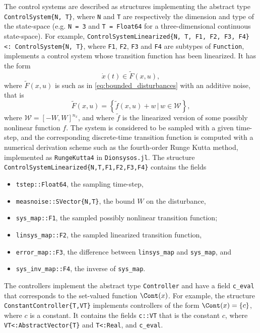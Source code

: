 \documentclass{juliacon}
\begin{document}
The control systems are described as structures implementing the abstract type \texttt{ControlSystem\{N, T\}}, where \texttt{N} and \texttt{T} are respectively the dimension and type of the state-space (e.g. \texttt{N = 3} and \texttt{T = Float64} for a three-dimensional continuous state-space). For example, \texttt{ControlSystemLinearized\{N, T, F1, F2, F3, F4\} <: ControlSystem\{N, T\}}, where \texttt{F1}, \texttt{F2}, \texttt{F3} and \texttt{F4} are subtypes of \texttt{Function}, implements a control system whose transition function has been linearized. It has the form
\begin{equation}
    \dot{x}(t) \in \tilde{F}(x, u), 
\end{equation}
where $\tilde{F}(x, u)$ is such as in \eqref{eq:bounded_disturbances} with an additive noise, that is
\begin{equation}
    \tilde{F}(x, u) = \left\{\tilde{f}(x, u) + w \, | \, w \in \mathcal{W}\right\}, 
\end{equation}
where $\mathcal{W} = [-W, W]^{n_x}$, and where $\tilde{f}$ is the linearized version of some possibly nonlinear function $f$. The system is considered to be sampled with a given time-step, and the corresponding discrete-time transition function is computed with a numerical derivation scheme such as the fourth-order Runge Kutta method, implemented as 
\texttt{RungeKutta4} in \texttt{Dionsysos.jl}. The structure \texttt{ControlSystemLinearized\{N,T,F1,F2,F3,F4\}} contains the fields
\begin{itemize}
    \item \texttt{tstep::Float64}, the sampling time-step,  
    \item \texttt{measnoise::SVector\{N,T\}}, the bound $W$ on the disturbance, 
    \item \texttt{sys\_map::F1}, the sampled possibly nonlinear transition function; 
    \item \texttt{linsys\_map::F2}, the sampled linearized transition function, 
    \item \texttt{error\_map::F3}, the difference between \texttt{linsys\_map} and \texttt{sys\_map}, and
    \item \texttt{sys\_inv\_map::F4}, the inverse of \texttt{sys\_map}.
\end{itemize} 

\vskip 6pt

The controllers implement the abstract type \texttt{Controller} and have a field \texttt{c\_eval} that corresponds to the set-valued function $\Cont(x)$. For example, the structure \texttt{ConstantController\{T,VT\}} implements controllers of the form $\Cont(x) = \{c\}$, where $c$ is a constant. It contains the fields \texttt{c::VT} that is the constant $c$, where \texttt{VT<:AbstractVector\{T\}} and \texttt{T<:Real}, and \texttt{c\_eval}.
\end{document}
